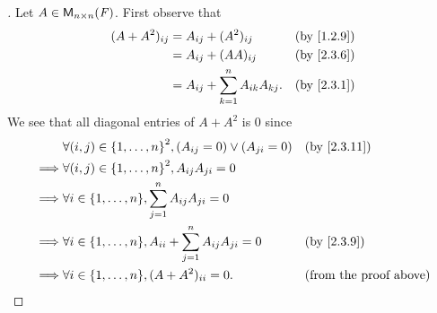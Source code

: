 \begin{proof}[]
	Let \(A \in \ms[n][n][\F]\).
	First observe that
	\begin{align*}
		(A + A^2)_{i j} & = A_{i j} + (A^2)_{i j}                     &  & \by{1.2.9} \\
		                & = A_{i j} + (AA)_{i j}                      &  & \by{2.3.6} \\
		                & = A_{i j} + \sum_{k = 1}^n A_{i k} A_{k j}. &  & \by{2.3.1}
	\end{align*}
	We see that all diagonal entries of \(A + A^2\) is \(0\) since
	\begin{align*}
		         & \forall (i, j) \in \set{1, \dots, n}^2, (A_{i j} = 0) \lor (A_{j i} = 0)      &  & \by{2.3.11}                   \\
		\implies & \forall (i, j) \in \set{1, \dots, n}^2, A_{i j} A_{j i} = 0                                                      \\
		\implies & \forall i \in \set{1, \dots, n}, \sum_{j = 1}^n A_{i j} A_{j i} = 0                                              \\
		\implies & \forall i \in \set{1, \dots, n}, A_{i i} + \sum_{j = 1}^n A_{i j} A_{j i} = 0 &  & \by{2.3.9}                    \\
		\implies & \forall i \in \set{1, \dots, n}, (A + A^2)_{i i} = 0.                         &  & \text{(from the proof above)}
	\end{align*}


\end{proof}
